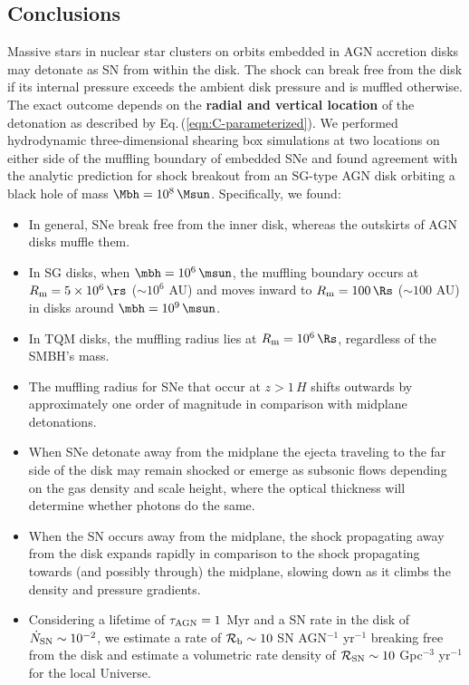 
\subsection{Conclusions}
\label{sec:conclusions-ch3}
Massive stars in nuclear star clusters on orbits embedded in AGN accretion disks may detonate as SN from within the disk.
The shock can break free from the disk if its internal pressure exceeds the ambient disk pressure and is muffled otherwise.
The exact outcome depends on the \textbf{radial and vertical location} of the detonation as described by Eq.\,(\ref{eqn:C-parameterized}).
We performed hydrodynamic three-dimensional shearing box simulations at two locations on either side of the muffling boundary of embedded SNe and found agreement with the analytic prediction for shock breakout from an SG-type AGN disk orbiting a black hole of mass $\Mbh=10^8\,\Msun$.
Specifically, we found:

\begin{itemize}
    \item In general, SNe break free from the inner disk, whereas the outskirts of AGN disks muffle them.
    \item In SG disks, when $\mbh=10^6\,\msun$, the muffling boundary occurs at $R_{\rm m}=5\times10^6\,\rs$ ($\sim10^6$ AU) and moves inward to $R_{\rm m}=100\,\Rs$ ($\sim100$ AU) in disks around $\mbh=10^9\,\msun$.
    \item In TQM disks, the muffling radius lies at $R_{\rm m}=10^6\,\Rs$, regardless of the SMBH's mass.
    \item The muffling radius for SNe that occur at $z>1\,H$ shifts outwards by approximately one order of magnitude in comparison with midplane detonations.
    \item When SNe detonate away from the midplane the ejecta traveling to the far side of the disk may remain shocked or emerge as subsonic flows depending on the gas density and scale height, where the optical thickness will determine whether photons do the same.
    \item When the SN occurs away from the midplane, the shock propagating away from the disk expands rapidly in comparison to the shock propagating towards (and possibly through) the midplane, slowing down as it climbs the density and pressure gradients.
    \item Considering a lifetime of $\tau_{\rm AGN}=1$ Myr and a SN rate in the disk of $\dot{N}_{\rm SN} \sim 10^{-2}$, we estimate a rate of $\mathcal{R}_{\rm b} \sim 10$ SN AGN$^{-1}$ yr$^{-1}$ breaking free from the disk and estimate a volumetric rate density of $\mathcal{R}_{\rm SN} \sim 10$ Gpc$^{-3}$ yr$^{-1}$ for the local Universe.
\end{itemize}


